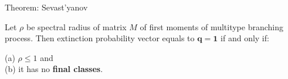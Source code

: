 \documentclass[t,usenames,dvipsnames]{beamer} %
\newcommand{\1}{\boldsymbol{1}}
\newcommand{\0}{\boldsymbol{0}}
\begin{document}
\begin{frame}
\end{frame}
\begin{frame}
\end{frame}
\begin{frame}
\end{frame}
\begin{frame}
\end{frame}



\begin{frame}
    \label{Seva}
    \sevast

\begin{block}{Theorem: Sevast'yanov}

    Let $\rho$ be spectral radius of 
    matrix $M$ of first moments of multitype branching process.
    Then extinction probability vector equals to $\mathbf{q = 1}$
    if and only if:
    
(a) \( \rho \le 1 \) and \\
(b) it has no \textbf{final classes}.

\end{block}

 \hyperlink{Thm}{\beamergotobutton{-}}

\end{frame}
\end{document}
